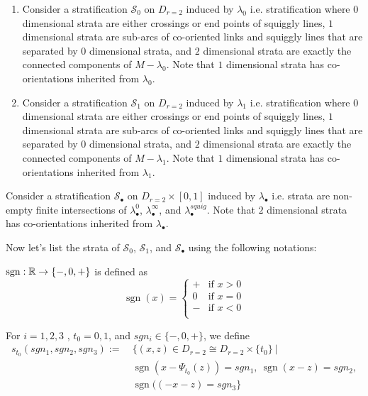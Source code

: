 \begin{definition}
\begin{enumerate}
\item Consider a stratification $\mathcal{S}_0$ on $D_{r=2}$ induced by $\lambda_0$ i.e. stratification where $0$ dimensional strata are either crossings or end points of squiggly lines, $1$ dimensional strata are sub-arcs of co-oriented links and squiggly lines that are separated by $0$ dimensional strata, and $2$ dimensional strata are exactly the connected components of $M-\lambda_0$. Note that $1$ dimensional strata has co-orientations inherited from $\lambda_0$.

\item Consider a stratification $\mathcal{S}_1$ on $D_{r=2}$ induced by $\lambda_1$ i.e. stratification where $0$ dimensional strata are either crossings or end points of squiggly lines, $1$ dimensional strata are sub-arcs of co-oriented links and squiggly lines that are separated by $0$ dimensional strata, and $2$ dimensional strata are exactly the connected components of $M-\lambda_1$. Note that $1$ dimensional strata has co-orientations inherited from $\lambda_1$.
\end{enumerate}

\item Consider a stratification $\mathcal{S}_\bullet$ on $D_{r=2}\times [0,1]$ induced by $\lambda_\bullet$ i.e. strata are non-empty finite intersections of $\lambda_\bullet^0$, $\lambda_\bullet^\infty$, and $\lambda_\bullet^{squig}$. Note that $2$ dimensional strata has co-orientations inherited from $\lambda_\bullet$.
\end{definition}

Now let's list the strata of $\mathcal{S}_0$, $\mathcal{S}_1$, and $\mathcal{S}_\bullet$ using the following notations:
\begin{definition}
$\operatorname{sgn} : \mathbb{R} \rightarrow \{-,0,+ \}$ is defined as 
\[\operatorname{sgn}(x)=\left\{
\begin{array}{ll}
    + & \text{if } x > 0 \\
    0 & \text{if } x = 0 \\
	- & \text{if } x < 0 \\
\end{array}
\right.
\]
\end{definition}

\begin{definition}
For $i = 1,2,3$ , $t_0 = 0,1$, and $sgn_i \in \{-,0,+\}$, we define
\begin{align*}
s_{t_0}(sgn_1,sgn_2,sgn_3):=~ &\{(x,z) \in D_{r=2}\cong D_{r=2}\times \{t_0\} ~| \\
&\operatorname{sgn}(x-\Psi_{t_0}(z))=sgn_1,~ \operatorname{sgn}(x-z)=sgn_2,\\ 
&\operatorname{sgn}((-x-z)=sgn_3\}
\end{align*}
\end{definition}

